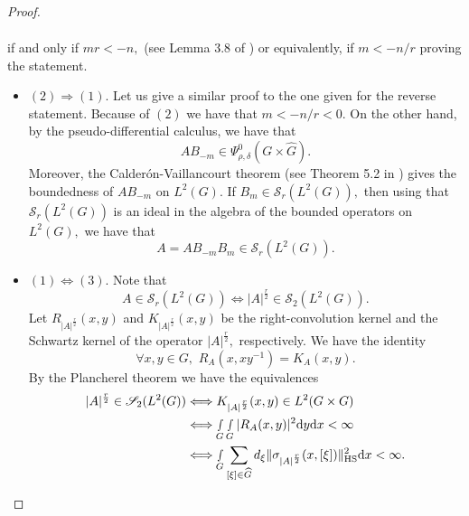 \documentclass[12pt, reqno]{amsart}
\theoremstyle{definition}
\theoremstyle{remark}
\numberwithin{equation}{section}
\begin{document}
\begin{proof}
\begin{itemize}
\begin{align*}
\end{align*}if and only if $mr<-n,$ (see Lemma 3.8 of \cite{DelRuzTrace11}) or equivalently, if $m<-n/r$ proving the statement.
    \end{itemize}
    \begin{itemize}
    \item $(2)\Longrightarrow (1).$ Let us give a similar proof to the one given for the reverse statement. Because of $(2)$ we have that $m<-n/r<0.$ On the other hand,    by the pseudo-differential calculus, we have that
    \begin{equation}
            AB_{-m}\in \Psi^{0}_{\rho,\delta}(G\times \widehat{G}).
        \end{equation}  Moreover, the Calder\'on-Vaillancourt theorem (see Theorem 5.2 in \cite{RuzhanskyWirth2014})  gives the boundedness of $AB_{-m}$ on $L^2(G).$ If $B_{m}\in\mathscr{S}_r(L^2(G)),$ then using that $\mathscr{S}_{r}(L^2(G))$ is an ideal in the algebra of the bounded operators on $L^2(G),$ we have that
        \begin{equation*}
            A=AB_{-m}B_{m}\in\mathscr{S}_r(L^2(G)).
        \end{equation*}
\item $(1)\Longleftrightarrow(3).$ Note that
\begin{equation}
    A\in \mathscr{S}_{r}(L^2(G))\Longleftrightarrow |A|^{\frac{r}{2}}\in\mathscr{S}_2(L^2(G)).
\end{equation}Let $R_{|A|^{\frac{r}{2}}}(x,y) $ and $K_{|A|^{\frac{r}{2}}}(x,y) $ be the right-convolution kernel and the Schwartz kernel  of the operator $|A|^{\frac{r}{2}},$ respectively. We have the identity $$ \forall x,y\in G,\,\, R_{A}(x,xy^{-1})=K_A(x,y).$$   By the Plancherel theorem we have the equivalences
\begin{align*}
    |A|^{\frac{r}{2}}\in\mathscr{S}_2(L^2(G))  &\Longleftrightarrow K_{|A|^{\frac{r}{2}}}(x,y)\in L^2(G\times G)\\
    &\Longleftrightarrow \smallint\limits_{G}\smallint\limits_{G}|R_{A}(x,y)|^2\textnormal{d}y\textnormal{d}x<\infty\\
    &\Longleftrightarrow \smallint\limits_{G}\sum_{[\xi]\in \widehat{G}} d_\xi\Vert\sigma_{|A|^{\frac{r}{2}}} (x,[\xi])\|^2_{\textnormal{HS}}\textnormal{d}x<\infty.
\end{align*}


\end{itemize}
\end{proof}
\end{document}
